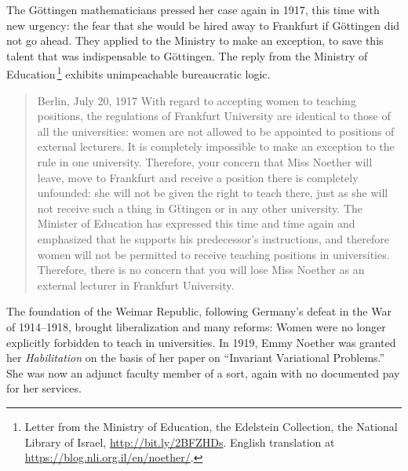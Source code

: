 \documentclass[twoside,symmetric]{tufte-handout}
\begin{document}
The G\"ottingen mathematicians pressed her case again in 1917, this time with new urgency: the fear that she would be hired away to Frankfurt if G\"ottingen did not go ahead. They applied to the Ministry to make an exception, to save this talent that was indispensable to G\"ottingen. The reply from the Ministry of Education$\,$\footnote{Letter from the Ministry of Education, the Edelstein Collection, the National Library of Israel, \url{http://bit.ly/2BFZHDs}. English translation at \url{https://blog.nli.org.il/en/noether/}.} exhibits unimpeachable bureaucratic logic.\vspace*{-6pt}
\begin{quotation}
\phantom{M}\hfill Berlin, July 20, 1917\phantom{MMM}\break
With regard to accepting women to teaching positions, the regulations of Frankfurt University are identical to those of all the universities: women are not allowed to be appointed to positions of external lecturers. It is completely impossible to make an exception to the rule in one university. Therefore, your concern that Miss Noether will leave, move to Frankfurt and receive a position there is completely unfounded: she will not be given the right to teach there, just as she will not receive such a thing in G\"ttingen or in any other university. The Minister of Education has expressed this time and time again and emphasized that he supports his predecessor's instructions, and therefore women will not be permitted to receive teaching positions in universities.\\[6pt]
\noindent Therefore, there is no concern that you will lose Miss Noether as an external lecturer in Frankfurt University.
\end{quotation}

The foundation of the Weimar Republic, following Germany's defeat in the War of 1914--1918, brought liberalization and many reforms: Women were no longer explicitly forbidden to teach in universities. In 1919, Emmy Noether was granted her \emph{Habilitation} on the basis of her paper on ``Invariant Variational Problems.'' She was now an adjunct faculty member of a sort, again with no documented pay for her services.

\end{document}

